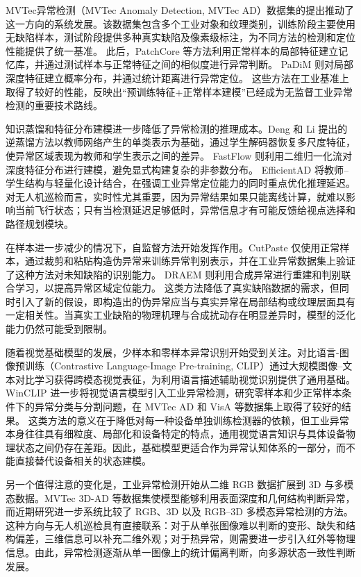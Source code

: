 MVTec异常检测（MVTec Anomaly Detection, MVTec AD）数据集的提出推动了这一方向的系统发展。该数据集包含多个工业对象和纹理类别，训练阶段主要使用无缺陷样本，测试阶段提供多种真实缺陷及像素级标注，为不同方法的检测和定位性能提供了统一基准\cite{Bergmann2019MVTec,Wang2024RealIAD}。 此后，PatchCore 等方法利用正常样本的局部特征建立记忆库，并通过测试样本与正常特征之间的相似度进行异常判断\cite{Roth2022PatchCore}。 PaDiM 则对局部深度特征建立概率分布，并通过统计距离进行异常定位\cite{Defard2021PaDiM}。 这些方法在工业基准上取得了较好的性能，反映出“预训练特征+正常样本建模”已经成为无监督工业异常检测的重要技术路线。

知识蒸馏和特征分布建模进一步降低了异常检测的推理成本。Deng 和 Li 提出的逆蒸馏方法以教师网络产生的单类表示为基础，通过学生解码器恢复多尺度特征，使异常区域表现为教师和学生表示之间的差异\cite{Deng2022RD}。 FastFlow 则利用二维归一化流对深度特征分布进行建模，避免显式构建复杂的非参数分布\cite{Yu2022FastFlow}。 EfficientAD 将教师--学生结构与轻量化设计结合，在强调工业异常定位能力的同时重点优化推理延迟\cite{Batzner2024EfficientAD,liu2023simplenet,coscia2025onen}。 对无人机巡检而言，实时性尤其重要，因为异常结果如果只能离线计算，就难以影响当前飞行状态；只有当检测延迟足够低时，异常信息才有可能反馈给视点选择和路径规划模块。

在样本进一步减少的情况下，自监督方法开始发挥作用。CutPaste 仅使用正常样本，通过裁剪和粘贴构造伪异常来训练异常判别表示，并在工业异常数据集上验证了这种方法对未知缺陷的识别能力\cite{Li2021CutPaste,zhu2024inctrl}。 DRAEM 则利用合成异常进行重建和判别联合学习，以提高异常区域定位能力\cite{Zavrtanik2021DRAEM,li2024musc}。 这类方法降低了真实缺陷数据的需求，但同时引入了新的假设，即构造出的伪异常应当与真实异常在局部结构或纹理层面具有一定相关性。当真实工业缺陷的物理机理与合成扰动存在明显差异时，模型的泛化能力仍然可能受到限制。

随着视觉基础模型的发展，少样本和零样本异常识别开始受到关注。对比语言-图像预训练（Contrastive Language-Image Pre-training, CLIP）通过大规模图像--文本对比学习获得跨模态视觉表征，为利用语言描述辅助视觉识别提供了通用基础\cite{Radford2021CLIP,zhou2024anomalyclip}。 WinCLIP 进一步将视觉语言模型引入工业异常检测，研究零样本和少正常样本条件下的异常分类与分割问题，在 MVTec AD 和 VisA 等数据集上取得了较好的结果\cite{Jeong2023WinCLIP,ma2025aaclip}。 这类方法的意义在于降低对每一种设备单独训练检测器的依赖，但工业异常本身往往具有细粒度、局部化和设备特定的特点，通用视觉语言知识与具体设备物理状态之间仍存在差距。因此，基础模型更适合作为异常认知体系的一部分，而不能直接替代设备相关的状态建模。

另一个值得注意的变化是，工业异常检测开始从二维 RGB 数据扩展到 3D 与多模态数据。MVTec 3D-AD 等数据集使模型能够利用表面深度和几何结构判断异常，而近期研究进一步系统比较了 RGB、3D 以及 RGB--3D 多模态异常检测的方法\cite{Bergmann2021MVTec3D,Li2025RGB3D,li2025mulsenad}。 这种方向与无人机巡检具有直接联系：对于从单张图像难以判断的变形、缺失和结构偏差，三维信息可以补充二维外观；对于热异常，则需要进一步引入红外等物理信息。由此，异常检测逐渐从单一图像上的统计偏离判断，向多源状态一致性判断发展。

